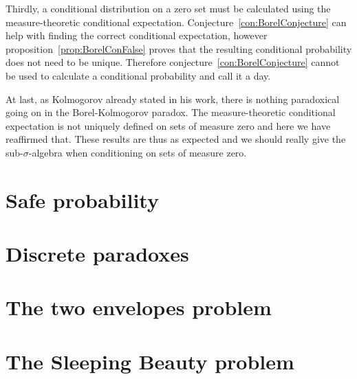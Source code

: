 \documentclass[twoside,a4paper]{report}
\theoremstyle{plain}
\theoremstyle{definition}
\theoremstyle{remark}
\numberwithin{equation}{chapter}
\DeclareMathOperator{\1}{\mathbbm{1}}
\begin{document}
Thirdly, a conditional distribution on a zero set must be calculated using the measure-theoretic conditional expectation. Conjecture~\ref{con:BorelConjecture} can help with finding the correct conditional expectation, however proposition~\ref{prop:BorelConFalse} proves that the resulting conditional probability does not need to be unique. Therefore conjecture~\ref{con:BorelConjecture} cannot be used to calculate a conditional probability and call it a day.

At last, as Kolmogorov \cite{Kolmogorov33} already stated in his work, there is nothing paradoxical going on in the Borel-Kolmogorov paradox. The measure-theoretic conditional expectation is not uniquely defined on sets of measure zero and here we have reaffirmed that. These results are thus as expected and we should really give the sub-$\sigma$-algebra when conditioning on sets of measure zero.


\chapter{Safe probability}\label{chap:SafeProp}

\chapter{Discrete paradoxes}\label{chap:DiscPara}

\chapter{The two envelopes problem}\label{chap:TwoEnvelope}

\chapter{The Sleeping Beauty problem}\label{chap:SleepingBeauty}




\appendix

\newpage

\printindex
\end{document}
